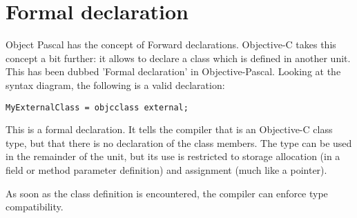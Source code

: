 \section{Formal declaration}
Object Pascal has the concept of Forward declarations. Objective-C takes
this concept a bit further: it allows to declare a class which is defined in
another unit. This has been dubbed 'Formal declaration' in Objective-Pascal.
Looking at the syntax diagram, the following is a valid declaration:
\begin{verbatim}
MyExternalClass = objcclass external;
\end{verbatim}
This is a formal declaration. It tells the compiler that
 is an Objective-C class type, but that there is no 
declaration of the class members. The type can be used in the remainder of
the unit, but its use is restricted to storage allocation (in a field or
method parameter definition) and assignment (much like a pointer).

As soon as the class definition is encountered, the compiler can enforce
type compatibility.

